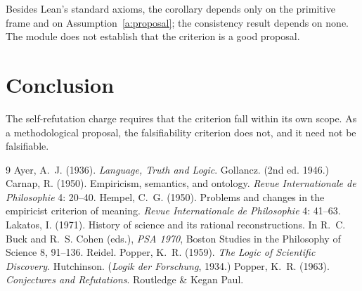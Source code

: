 \documentclass{situationist-preprint}
\begin{document}
Besides Lean's standard axioms, the corollary depends only on the primitive frame and on Assumption~\ref{a:proposal}; the consistency result depends on none. The module does not establish that the criterion is a good proposal.

\section{Conclusion}

The self-refutation charge requires that the criterion fall within its own scope. As a methodological proposal, the falsifiability criterion does not, and it need not be falsifiable.

\begin{thebibliography}{9}\small
{} Ayer, A.~J. (1936). \emph{Language, Truth and Logic}. Gollancz. (2nd ed. 1946.)
 Carnap, R. (1950). Empiricism, semantics, and ontology. \emph{Revue Internationale de Philosophie} 4: 20--40.
 Hempel, C.~G. (1950). Problems and changes in the empiricist criterion of meaning. \emph{Revue Internationale de Philosophie} 4: 41--63.
 Lakatos, I. (1971). History of science and its rational reconstructions. In R.~C. Buck and R.~S. Cohen (eds.), \emph{PSA 1970}, Boston Studies in the Philosophy of Science 8, 91--136. Reidel.
 Popper, K.~R. (1959). \emph{The Logic of Scientific Discovery}. Hutchinson. (\emph{Logik der Forschung}, 1934.)
 Popper, K.~R. (1963). \emph{Conjectures and Refutations}. Routledge \& Kegan Paul.
\end{thebibliography}
\end{document}
